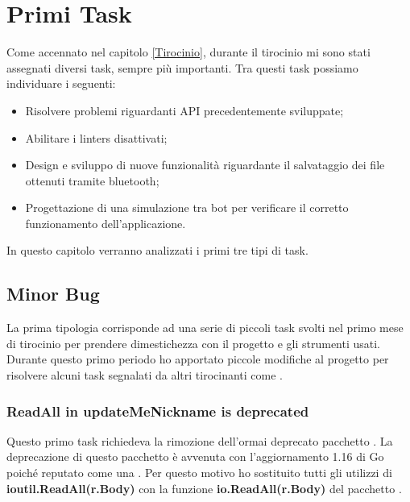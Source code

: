 \documentclass[main.tex]{subfiles}
\begin{document}
\sloppy


\vspace{1.0cm}

\chapter{Primi Task}\label{sec:Primi Task}
Come accennato nel capitolo \ref{Tirocinio}, durante il tirocinio mi sono stati assegnati diversi task, sempre più importanti. Tra questi task possiamo individuare i seguenti:
\begin{itemize}
    \item Risolvere problemi riguardanti API precedentemente sviluppate;
    \item Abilitare i linters disattivati;
    \item Design e sviluppo di nuove funzionalità riguardante il salvataggio dei file ottenuti tramite bluetooth;
    \item Progettazione di una simulazione tra bot per verificare il corretto funzionamento dell'applicazione.
\end{itemize}
In questo capitolo verranno analizzati i primi tre tipi di task.

\section{Minor Bug}
La prima tipologia corrisponde ad una serie di piccoli task svolti nel primo mese di tirocinio per prendere dimestichezza con il progetto e gli strumenti usati.\newline
Durante questo primo periodo ho apportato piccole modifiche al progetto per risolvere alcuni task segnalati da altri tirocinanti come . 

\subsection{ReadAll in updateMeNickname is deprecated}
Questo primo task richiedeva la rimozione dell'ormai deprecato pacchetto . \newline
La deprecazione di questo pacchetto è avvenuta con l'aggiornamento 1.16 \cite{Go116} di Go poiché reputato come una . Per questo motivo ho sostituito tutti gli utilizzi di \textbf{ioutil.ReadAll(r.Body)} con la funzione \textbf{io.ReadAll(r.Body)} del pacchetto . \newline
\end{document}
